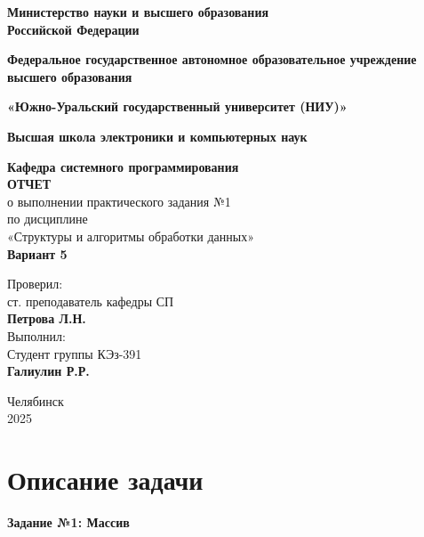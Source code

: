 \documentclass[a4paper,12pt]{article}
\begin{document}
	\begin{titlepage}
		\begin{center}
			{\large \textbf{Министерство науки и высшего образования \\ Российской Федерации}}
			
			{\large\textbf{Федеральное государственное автономное образовательное учреждение высшего образования}}
			
			{\large \textbf{«Южно-Уральский государственный университет (НИУ)»}}
			
			{\large \textbf{Высшая школа электроники и компьютерных наук}}
			
			{\large \textbf{Кафедра системного программирования}\\[2cm]
			}
			\textbf{ОТЧЕТ}\\[0.2cm]
			о выполнении практического задания №1\\[0.2cm]
			по дисциплине\\[0.2cm]
			«Структуры и алгоритмы обработки данных»\\[0.2cm]
			\textbf{Вариант 5}\\[3cm]
		\end{center}
		
		\begin{flushright}
			Проверил:\\[0.2cm]
			ст. преподаватель кафедры СП\\[0.2cm]
			\textbf{Петрова Л.Н.}\\[1cm]
						
			Выполнил:\\[0.2cm]
			Студент группы КЭз-391\\[0.2cm]
			\textbf{Галиулин Р.Р.}\\[0.2cm]
			
		\end{flushright}
		\vfill{}
		
		\begin{center}
			Челябинск \\ 2025
		\end{center}
	\end{titlepage}
	\newpage
	
	\tableofcontents
	
	\setcounter{page}{2}
	\newpage
	\section{Описание задачи}
	\textbf{Задание №1: Массив}
	
\end{document}
